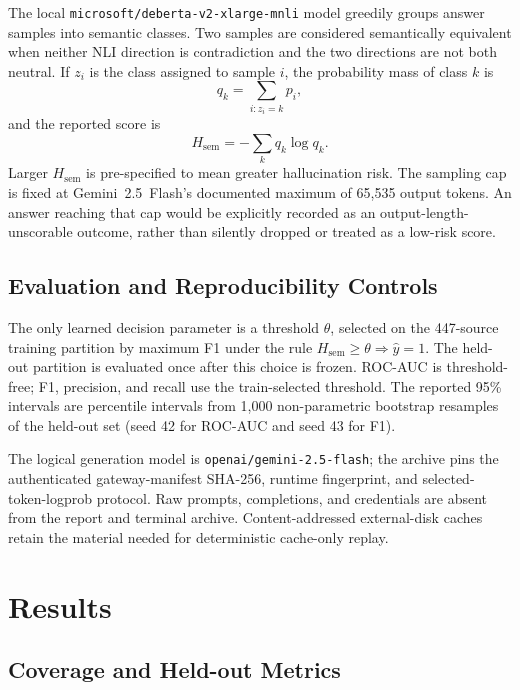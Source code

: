 \documentclass[11pt,a4paper]{article}
\newcommand{\Hsem}{H_{\mathrm{sem}}}
\begin{document}
The local \texttt{microsoft/deberta-v2-xlarge-mnli} model greedily groups answer samples into semantic classes.  Two samples are considered semantically equivalent when neither NLI direction is contradiction and the two directions are not both neutral.  If $z_i$ is the class assigned to sample $i$, the probability mass of class $k$ is
\begin{equation}
  q_k=\sum_{i:z_i=k}p_i,
\end{equation}
and the reported score is
\begin{equation}
  \Hsem=-\sum_k q_k\log q_k.
\end{equation}
Larger $\Hsem$ is pre-specified to mean greater hallucination risk.  The sampling cap is fixed at Gemini~2.5~Flash's documented maximum of 65,535 output tokens.  An answer reaching that cap would be explicitly recorded as an output-length-unscorable outcome, rather than silently dropped or treated as a low-risk score.

\subsection{Evaluation and Reproducibility Controls}

The only learned decision parameter is a threshold $\theta$, selected on the 447-source training partition by maximum F1 under the rule $\Hsem\geq\theta\Rightarrow\widehat{y}=1$.  The held-out partition is evaluated once after this choice is frozen.  ROC-AUC is threshold-free; F1, precision, and recall use the train-selected threshold.  The reported 95\% intervals are percentile intervals from 1,000 non-parametric bootstrap resamples of the held-out set (seed 42 for ROC-AUC and seed 43 for F1).

The logical generation model is \texttt{openai/gemini-2.5-flash}; the archive pins the authenticated gateway-manifest SHA-256, runtime fingerprint, and selected-token-logprob protocol.  Raw prompts, completions, and credentials are absent from the report and terminal archive.  Content-addressed external-disk caches retain the material needed for deterministic cache-only replay.

\section{Results}

\subsection{Coverage and Held-out Metrics}
\end{document}
